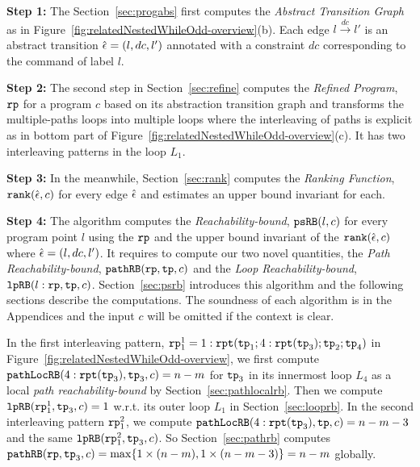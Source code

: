 
\textbf{Step 1: }
The Section~\ref{sec:progabs} first 
computes the \emph{Abstract Transition Graph} as in Figure~\ref{fig:relatedNestedWhileOdd-overview}(b).
Each edge $l \xrightarrow{dc} l'$ is an abstract transition $\hat{\mathtt{\epsilon}{}} = (l, dc, l')$ annotated with a constraint $dc$ corresponding to the command of label $l$.

\textbf{Step 2: }
The second step in Section~\ref{sec:refine}
computes the \emph{Refined Program}, $\mathtt{rp}$ for a program $c$ based on 
its abstraction transition graph and transforms the multiple-paths loops
into multiple loops where
the interleaving of paths is explicit as in bottom part of Figure~\ref{fig:relatedNestedWhileOdd-overview}(c).
It has two interleaving patterns in the loop $L_1$.

\textbf{Step 3: }
In the meanwhile, Section~\ref{sec:rank} computes the \emph{Ranking Function}, $\mathtt{rank}(\hat{\mathtt{\epsilon}{}}, c)$ 
for every edge $\hat{\mathtt{\epsilon}{}}$ 
and estimates an upper bound invariant for each.

\textbf{Step 4: }
The algorithm computes the \emph{Reachability-bound}, $\mathtt{psRB}(l, c)$ for every program point $l$ using the $\mathtt{rp}$ and the upper bound invariant of the $\mathtt{rank}(\hat{\mathtt{\epsilon}{}}, c)$ where $\hat{\mathtt{\epsilon}{}} = (l,dc,l')$.
It requires to compute our two novel quantities, the \emph{Path Reachability-bound}, $\mathtt{pathRB}(\mathtt{rp}, \mathtt{tp}, c)$ and the \emph{Loop Reachability-bound}, $\mathtt{lpRB}(l: \mathtt{rp}, \mathtt{tp}, c)$.
Section~\ref{sec:psrb} introduces this algorithm and the following sections describe the computations. 
The soundness of each algorithm is in the Appendices and the input $c$ will be omitted if the context is clear.

In the first interleaving pattern, $\mathtt{rp}_1^1 = 1: \mathtt{rpt}(\mathtt{tp}_1; 4:\mathtt{rpt}(\mathtt{tp}_3); \mathtt{tp}_2; \mathtt{tp}_4)$ in Figure~\ref{fig:relatedNestedWhileOdd-overview},
we first compute $\mathtt{pathLocRB}(4:\mathtt{rpt}(\mathtt{tp}_3), \mathtt{tp}_3, c) = n - m$
 for $\mathtt{tp}_3$ in its innermost loop $L_4$ as a local \emph{path reachability-bound} by Section~\ref{sec:pathlocalrb}.
Then we compute $\mathtt{lpRB}(\mathtt{rp}_1^1, \mathtt{tp}_3, c) = 1$ w.r.t. its outer loop $L_1$ in Section~\ref{sec:looprb}. In the second interleaving pattern $\mathtt{rp}_1^2$, we compute $\mathtt{pathLocRB}(4:\mathtt{rpt}(\mathtt{tp}_3), \mathtt{tp}, c) = n - m - 3$ and the same $\mathtt{lpRB}(\mathtt{rp}_1^2, \mathtt{tp}_3, c)$.
So Section~\ref{sec:pathrb} computes $\mathtt{pathRB}(\mathtt{rp}, \mathtt{tp}_3, c) = \max\{ 1 \times (n - m), 1 \times (n - m - 3) \} = n - m$ globally.

